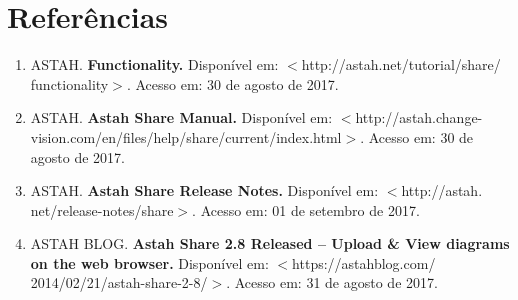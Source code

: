 \documentclass[12pt,a4paper]{article}
\begin{document}
\section{Referências}
\begin{enumerate}

\item ASTAH. \textbf{Functionality.} Disponível em: $<$http://astah.net/tutorial/share/
functionality$>$. Acesso em: 30 de agosto de 2017.

\item ASTAH. \textbf{Astah Share Manual.} Disponível em: $<$http://astah.change-vision.com/en/files/help/share/current/index.html$>$. Acesso em: 30 de agosto de 2017.

\item ASTAH. \textbf{Astah Share Release Notes.} Disponível em: $<$http://astah.
net/release-notes/share$>$. Acesso em: 01 de setembro de 2017.

\item ASTAH BLOG. \textbf{Astah Share 2.8 Released – Upload \& View diagrams on the web browser.}  Disponível em: $<$https://astahblog.com/
2014/02/21/astah-share-2-8/$>$. Acesso em: 31 de agosto de 2017.

\end{enumerate}
\end{document}

